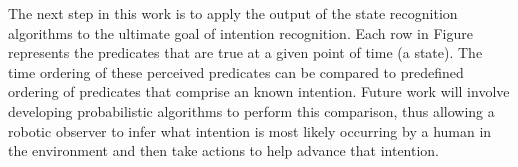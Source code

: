 \documentclass[preprint,12pt]{elsarticle}
\begin{document}
The next step in this work is to apply the output of the state recognition algorithms to the ultimate goal of intention recognition. Each row in Figure  represents the predicates that are true at a given point of time (a state). The time ordering of these perceived predicates can be compared to predefined ordering of predicates that comprise an known intention. Future work will involve developing probabilistic algorithms to perform this comparison, thus allowing a robotic observer to infer what intention is most likely occurring by a human in the environment and then take actions to help advance that intention.

%

%
%

\end{document}
